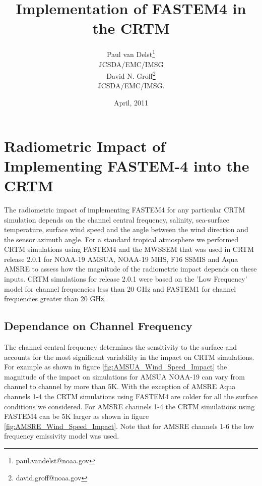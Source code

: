 

%

\title{Implementation of FASTEM4 in the CRTM}
\author{Paul van Delst\footnote{paul.vandelst@noaa.gov}\\JCSDA/EMC/IMSG\\[0.25in]
        David N. Groff\footnote{david.groff@noaa.gov}\\JCSDA/EMC/IMSG.}
\date{April, 2011}


\maketitle


\section{Radiometric Impact of Implementing FASTEM-4 into the CRTM}
The radiometric impact of implementing FASTEM4 for any particular CRTM simulation depends on the channel central frequency, salinity, sea-surface temperature, surface wind speed and the angle between the wind direction and the sensor azimuth angle.  For a standard tropical atmosphere we performed CRTM simulations using FASTEM4 and the MWSSEM that was used in CRTM release 2.0.1 for NOAA-19 AMSUA, NOAA-19 MHS, F16 SSMIS and Aqua AMSRE to assess how the magnitude of the radiometric impact depends on these inputs.  CRTM simulations for release 2.0.1 were based on the 'Low Frequency' model for channel frequencies less than 20 GHz and FASTEM1 for channel frequencies greater than 20 GHz. 

\subsection{Dependance on Channel Frequency}
The channel central frequency determines the sensitivity to the surface and accounts for the most significant variability in the impact on CRTM simulations.  For example as shown in figure \ref{fig:AMSUA_Wind_Speed_Impact} the magnitude of the impact on simulations for AMSUA NOAA-19 can vary from channel to channel by more than 5K.  With the exception of AMSRE Aqua channels 1-4 the CRTM simulations using FASTEM4 are colder for all the surface conditions we considered.  For AMSRE channels 1-4 the CRTM simulations using FASTEM4 can be 5K larger as shown in figure \ref{fig:AMSRE_Wind_Speed_Impact}.  Note that for AMSRE channels 1-6 the low frequency emissivity model was used.

